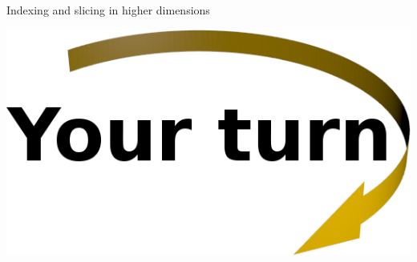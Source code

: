 \documentclass[svgnames]{beamer}
\begin{document}
\begin{frame}{Indexing and slicing in higher dimensions}
 \begin{center}
  \includegraphics[width=3truecm]{yourturn}
 \end{center}


\end{frame}
\end{document}
